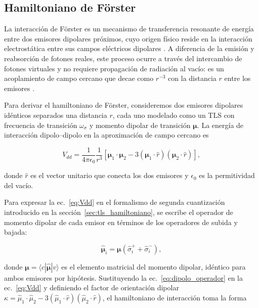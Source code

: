 \subsection{Hamiltoniano de Förster}
\label{sec:forster_interaccion}

La interacción de Förster es un mecanismo de transferencia resonante de energía entre dos emisores dipolares próximos, cuyo origen físico reside en la interacción electrostática entre sus campos eléctricos dipolares \cite{forster1948}. A diferencia de la emisión y reabsorción de fotones reales, este proceso ocurre a través del intercambio de fotones virtuales y no requiere propagación de radiación al vacío: es un acoplamiento de campo cercano que decae como $r^{-3}$ con la distancia $r$ entre los emisores \cite{forster1948,kagan1996}.

Para derivar el hamiltoniano de Förster, consideremos dos emisores dipolares idénticos separados una distancia $r$, cada uno modelado como un TLS con frecuencia de transición $\omega_\sigma$ y momento dipolar de transición $\boldsymbol{\mu}$. La energía de interacción dipolo--dipolo en la aproximación de campo cercano es \cite{forster1948}

\begin{equation}
	V_{dd} = \frac{1}{4\pi\epsilon_0}\frac{1}{r^3}
	\left[\boldsymbol{\mu}_1\cdot\boldsymbol{\mu}_2 -
	3(\boldsymbol{\mu}_1\cdot\hat{r})(\boldsymbol{\mu}_2\cdot\hat{r})\right],
	\label{eq:Vdd}
\end{equation}

donde $\hat{r}$ es el vector unitario que conecta los dos emisores y $\epsilon_0$ es la permitividad del vacío.

Para expresar la ec.~\eqref{eq:Vdd} en el formalismo de segunda cuantización introducido en la sección~\ref{sec:tls_hamiltoniano}, se escribe el operador de momento dipolar de cada emisor en términos de los operadores de subida y bajada:

\begin{equation}
	\hat{\boldsymbol{\mu}}_i = \boldsymbol{\mu}
	\left(\hat{\sigma}_i^+ + \hat{\sigma}_i^-\right),
	\label{eq:dipolo_operador}
\end{equation}

donde $\boldsymbol{\mu} = \langle c|\hat{\boldsymbol{\mu}}|v\rangle$ es el elemento matricial del momento dipolar, idéntico para ambos emisores por hipótesis. Sustituyendo la ec.~\eqref{eq:dipolo_operador} en la ec.~\eqref{eq:Vdd} y definiendo el factor de orientación dipolar $\kappa = \hat{\mu}_1\cdot\hat{\mu}_2 - 3(\hat{\mu}_1\cdot\hat{r})(\hat{\mu}_2\cdot\hat{r})$, el hamiltoniano de interacción toma la forma

